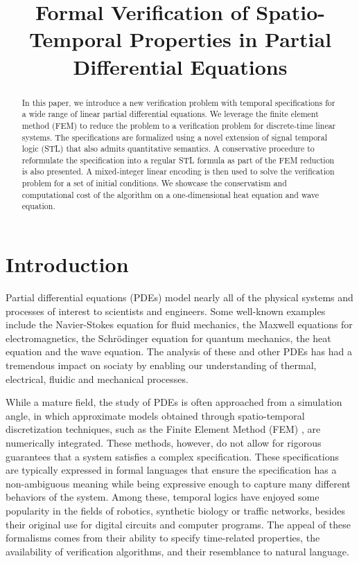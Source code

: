 \documentclass[letterpaper, 10 pt, conference]{ieeeconf/ieeeconf}
\title{\LARGE \bf
Formal Verification of Spatio-Temporal Properties in Partial Differential Equations
}
\author{\authorblockN{Francisco Penedo}
    \authorblockA{Division of Systems Engineering\\
    Boston University\\
    Email: franp@bu.edu}
\and \authorblockN{Harold Park}
    \authorblockA{Department of Mechanical Engineering\\
    Boston University\\
    Email: parkhs@bu.edu}
\and \authorblockN{Calin Belta}
    \authorblockA{Division of Systems Engineering\\
    Boston University\\
    Email: cbelta@bu.edu}
}
\begin{document}
\maketitle
\thispagestyle{empty}
\pagestyle{empty}

\begin{abstract}


    In this paper, we introduce a new verification problem with temporal
    specifications for a wide range of linear partial differential equations. 
    We leverage the finite
    element method (FEM) to reduce the problem to a verification problem for
    discrete-time linear systems. The specifications are formalized using a
    novel extension of signal temporal logic (STL) that also admits quantitative
    semantics. A conservative procedure to reformulate the specification into a
    regular STL formula as part of the FEM reduction is also presented. A
    mixed-integer linear encoding is then used to solve the verification problem
    for a set of initial conditions.
    We showcase the conservatism and computational cost of the algorithm on a
    one-dimensional heat equation and wave equation.

\end{abstract}

\section{Introduction}
\label{sec:introduction}

Partial differential equations (PDEs) model nearly all of the physical systems
and processes of interest to scientists and engineers. Some well-known examples
include the Navier-Stokes equation for fluid mechanics, the Maxwell equations
for electromagnetics, the Schrödinger equation for quantum mechanics, the heat
equation and the wave equation. The analysis of these and other PDEs has had a
tremendous impact on sociaty by enabling our understanding of thermal,
electrical, fluidic and mechanical processes.

While a mature field, the study of PDEs is often approached from a simulation
angle, in which approximate models obtained through spatio-temporal
discretization techniques, such as the Finite Element Method (FEM)
\cite{hughes_finite_2000}, are numerically integrated. These methods, however,
do not allow for rigorous guarantees that a system satisfies a complex
specification. These specifications are typically expressed in formal languages
that ensure the specification has a non-ambiguous meaning while being expressive
enough to capture many different behaviors of the system. 
Among these, temporal logics have enjoyed some
popularity in the fields of robotics, synthetic biology or traffic networks,
besides their original use for digital circuits and computer programs. The
appeal of these formalisms comes from their ability to specify time-related
properties, the availability of verification algorithms, and their resemblance
to natural language.
\end{document}
